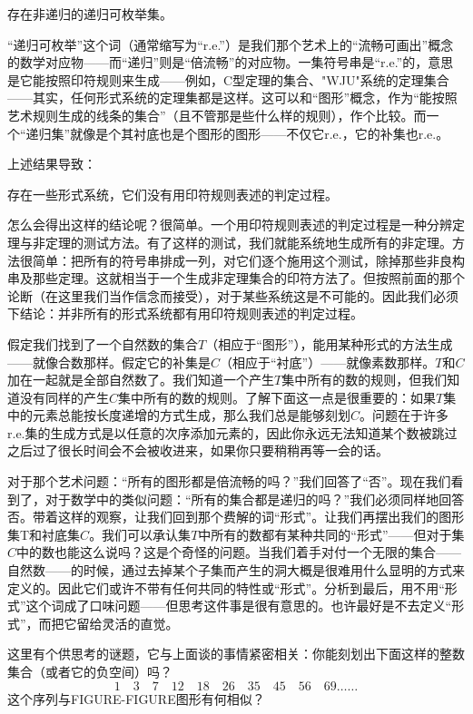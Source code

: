 \begin{block}
存在非递归的递归可枚举集。
\end{block}
“递归可枚举”这个词（通常缩写为“r.e.”）是我们那个艺术上的“流畅可画出”概念的数学对应物——而“递归”则是“倍流畅”的对应物。一集符号串是“r.e.”的，意思是它能按照印符规则来生成——例如，C型定理的集合、"WJU"系统的定理集合——其实，任何形式系统的定理集都是这样。这可以和“图形”概念，作为“能按照艺术规则生成的线条的集合”（且不管那是些什么样的规则），作个比较。而一个“递归集”就像是个其衬底也是个图形的图形——不仅它r.e.，它的补集也r.e.。

上述结果导致：

\begin{block}
存在一些形式系统，它们没有用印符规则表述的判定过程。
\end{block}
怎么会得出这样的结论呢？很简单。一个用印符规则表述的判定过程是一种分辨定理与非定理的测试方法。有了这样的测试，我们就能系统地生成所有的非定理。方法很简单：把所有的符号串排成一列，对它们逐个施用这个测试，除掉那些非良构串及那些定理。这就相当于一个生成非定理集合的印符方法了。但按照前面的那个论断（在这里我们当作信念而接受），对于某些系统这是不可能的。因此我们必须下结论：并非所有的形式系统都有用印符规则表述的判定过程。

假定我们找到了一个自然数的集合$T$（相应于“图形”），能用某种形式的方法生成——就像合数那样。假定它的补集是$C$（相应于“衬底”）——就像素数那样。$T$和$C$加在一起就是全部自然数了。我们知道一个产生$T$集中所有的数的规则，但我们知道没有同样的产生$C$集中所有的数的规则。了解下面这一点是很重要的：如果$T$集中的元素总能按长度递增的方式生成，那么我们总是能够刻划$C$。问题在于许多r.e.集的生成方式是以任意的次序添加元素的，因此你永远无法知道某个数被跳过之后过了很长时间会不会被收进来，如果你只要稍稍再等一会的话。

对于那个艺术问题：“所有的图形都是倍流畅的吗？”我们回答了“否”。现在我们看到了，对于数学中的类似问题：“所有的集合都是递归的吗？”我们必须同样地回答否。带着这样的观察，让我们回到那个费解的词“形式”。让我们再摆出我们的图形集T和衬底集$C$。我们可以承认集$T$中所有的数都有某种共同的“形式”——但对于集$C$中的数也能这么说吗？这是个奇怪的问题。当我们着手对付一个无限的集合——自然数——的时候，通过去掉某个子集而产生的洞大概是很难用什么显明的方式来定义的。因此它们或许不带有任何共同的特性或“形式”。分析到最后，用不用“形式”这个词成了口味问题——但思考这件事是很有意思的。也许最好是不去定义“形式”，而把它留给灵活的直觉。

这里有个供思考的谜题，它与上面谈的事情紧密相关：你能刻划出下面这样的整数集合（或者它的负空间）吗？
\[
1\quad 3\quad 7\quad 12\quad 18\quad 26\quad 35\quad 45\quad 56\quad 69
\ldots\ldots
\]
这个序列与FIGURE-FIGURE图形有何相似？

